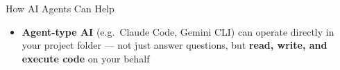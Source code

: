 \documentclass[dvipsnames,hyperref={pdfpagelabels=false}]{beamer}
\begin{document}
\begin{frame}{How AI Agents Can Help}{}
\begin{itemize}
    \item \textbf{Agent-type AI} (e.g.\ Claude Code, Gemini CLI) can operate
    directly in your project folder --- not just answer questions, but
    \textbf{read, write, and execute code} on your behalf
\end{itemize}
\end{frame}
\end{document}
